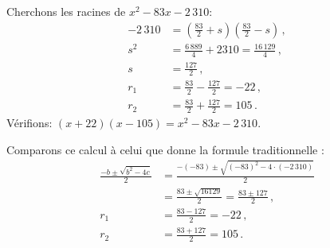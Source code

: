 \begin{example}
Cherchons les racines de $x^2-83x-2\,310$:
\begin{align*}
-2\,310&=\left(\frac{83}{2}+s\right)\left(\frac{83}{2} -s\right)\,,\\
s^2&=\frac{6\,889}{4}+2310=\frac{16\,129}{4}\,,\\
s&=\frac{127}{2}\,,\\
r_1&=\frac{83}{2}-\frac{127}{2}=-22\,,\\
r_2&=\frac{83}{2}+\frac{127}{2}=105\,.
\end{align*}
Vérifions: $(x+22)(x-105)= x^2-83x-2\,310$.



Comparons ce calcul à celui que donne la formule traditionnelle :
\begin{align*}
\frac{-b\pm\sqrt{b^2-4c}}{2}&=\frac{-(-83)\pm\sqrt{(-83)^2-4\cdot (-2\,310)}}{2}\\
&= \frac{83\pm\sqrt{16129}}{2} = \frac{83\pm 127}{2}\,,\\
r_1&=\frac{83-127}{2}=-22\,,\\
r_2&=\frac{83+127}{2}=105\,.
\end{align*}
\end{example}

